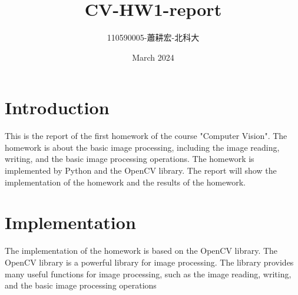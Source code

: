 \documentclass{article}
\title{CV-HW1-report}
\author{110590005-蕭耕宏-北科大}
\date{March 2024}
\begin{document}
\maketitle

\section{Introduction}
This is the report of the first homework of the course "Computer Vision". The homework is about the basic image processing, including the image reading, writing, and the basic image processing operations. The homework is implemented by Python and the OpenCV library. The report will show the implementation of the homework and the results of the homework.

\section{Implementation}
The implementation of the homework is based on the OpenCV library. The OpenCV library is a powerful library for image processing. The library provides many useful functions for image processing, such as the image reading, writing, and the basic image processing operations
\end{document}
